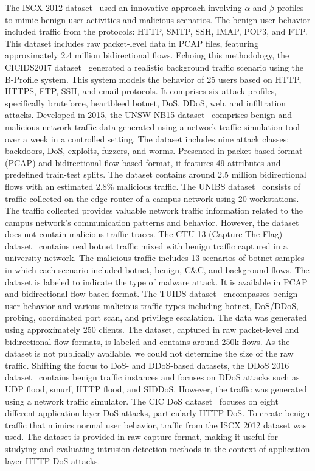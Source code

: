 \documentclass[lettersize,journal]{IEEEtran}
\begin{document}
The ISCX 2012 dataset~\cite{shiravi12iscx} used an innovative approach involving $\alpha$ and $\beta$ profiles to mimic benign user activities and malicious scenarios. The benign user behavior included traffic from the protocols: \ac{HTTP}, \ac{SMTP}, \ac{SSH}, \ac{IMAP}, \ac{POP3}, and \ac{FTP}. This dataset includes raw packet-level data in \ac{PCAP} files, featuring approximately 2.4 million bidirectional flows. Echoing this methodology, the CICIDS2017 dataset~\cite{sharafaldin2018CICIDS} generated a realistic background traffic scenario using the B-Profile system. This system models the behavior of 25 users based on \ac{HTTP}, \ac{HTTPS}, \ac{FTP}, \ac{SSH}, and email protocols. It comprises six attack profiles, specifically bruteforce, heartbleed botnet, \ac{DoS}, \ac{DDoS}, web, and infiltration attacks. Developed in 2015, the UNSW-NB15 dataset~\cite{moustafa15UNSW} comprises benign and malicious network traffic data generated using a network traffic simulation tool over a week in a controlled setting. The dataset includes nine attack classes: backdoors, \ac{DoS}, exploits, fuzzers, and worms. Presented in packet-based format (\ac{PCAP}) and bidirectional flow-based format, it features 49 attributes and predefined train-test splits. The dataset contains around 2.5 million bidirectional flows with an estimated 2.8\% malicious traffic. The UNIBS dataset~\cite{gringoli2009UNIBS} consists of traffic collected on the edge router of a campus network using 20 workstations. The traffic collected provides valuable network traffic information related to the campus network's communication patterns and behavior. However, the dataset does not contain malicious traffic traces. The CTU-13 (Capture The Flag) dataset~\cite{garcia2014CTU} contains real botnet traffic mixed with benign traffic captured in a university network. The malicious traffic includes 13 scenarios of botnet samples in which each scenario included botnet, benign, C\&C, and background flows. The dataset is labeled to indicate the type of malware attack. It is available in \ac{PCAP} and bidirectional flow-based format. The TUIDS dataset~\cite{bhuyan2015TUIDS} encompasses benign user behavior and various malicious traffic types including botnet, \ac{DoS}/\ac{DDoS}, probing, coordinated port scan, and privilege escalation. The data was generated using approximately 250 clients. The dataset, captured in raw packet-level and bidirectional flow formats, is labeled and contains around 250k flows. As the dataset is not publically available, we could not determine the size of the raw traffic. Shifting the focus to \ac{DoS}- and \ac{DDoS}-based datasets, the \ac{DDoS} 2016 dataset~\cite{alkasassbeh2016DDoS} contains benign traffic instances and focuses on \ac{DDoS} attacks such as \ac{UDP} flood, smurf, \ac{HTTP} flood, and \ac{SIDDoS}. However, the traffic was generated using a network traffic simulator. The CIC DoS dataset~\cite{jazi2017CICDoS} focuses on eight different application layer \ac{DoS} attacks, particularly HTTP \ac{DoS}. To create benign traffic that mimics normal user behavior, traffic from the ISCX 2012 dataset was used. The dataset is provided in raw capture format, making it useful for studying and evaluating intrusion detection methods in the context of application layer HTTP \ac{DoS} attacks.
\end{document}
